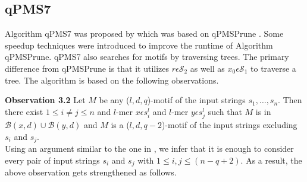 \subsection{qPMS7}
Algorithm qPMS7 was proposed by \cite{dinh2012qpms7} which was based on qPMSPrune \cite{davila2007fast}. Some speedup techniques were introduced to improve the runtime of Algorithm qPMSPrune. 
qPMS7 also searches for motifs by traversing trees. The primary difference from qPMSPrune is that it utilizes $r\epsilon \mathcal{S}_2$ as well as $x_0 \epsilon \mathcal{S}_1$ to traverse a tree. The algorithm is based on the following observations.

\textbf{Observation 3.2} Let $M$ be any ($l, d, q$)-motif of the input strings $s_1,\dots,s_n$. Then there exist $1\leq i\neq j\leq n$ and $l$-mer $x\epsilon s_{i}^{l}$ and $l$-mer $y\epsilon s_{j}^{l}$ such that $M$ is in $\mathcal{B}(x,d) \cup \mathcal{B}(y,d)$ and $M$ is a ($l, d, q-2$)-motif of the input strings excluding $s_i$ and $s_j$.\\
Using an argument similar to the one in \cite{davila2007fast}, we infer that it is enough to consider every pair of input strings $s_i$ and $s_j$ with $1\leq i,j\leq(n-q+2)$. As a result, the above observation gets strengthened as follows.\\
